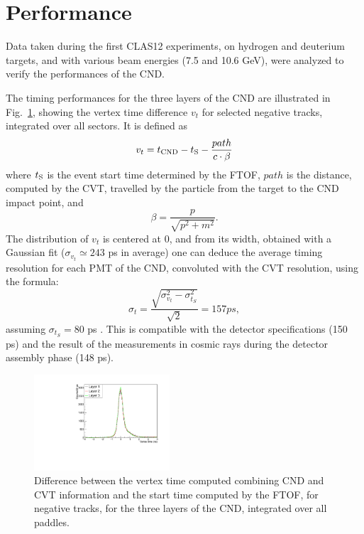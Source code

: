 \section{Performance}

Data taken during the first CLAS12 experiments, on hydrogen and deuterium targets, and with various beam energies (7.5 and 10.6 GeV), were analyzed to verify the performances of the CND. 

The timing performances for the three layers of the CND are illustrated in Fig.~\ref{fig_performance_deltat_layers}, showing the vertex time difference $v_t$ for selected negative tracks, integrated over all sectors. It is defined as
\begin{equation}\label{eq_vtp_definition}
v_t=t_{\rm{CND}}-t_{\rm{S}}-\frac{path}{c \cdot \beta}
\end{equation}
where $t_{\rm{S}}$ is the event start time determined by the FTOF, $path$ is the distance, computed by the CVT, travelled by the particle from the target to the CND impact point, and
\begin{equation}\label{eq_beta_definition}
\beta=\frac{p}{\sqrt{p^2+m^2}} .
\end{equation}
The distribution of $v_t$ is centered at 0, and from its width, obtained with a Gaussian fit ($\sigma_{v_t}\simeq 243$ ps in average) one can deduce the average timing resolution for each PMT of the CND, convoluted with the CVT resolution, using the formula:
\begin{equation}\label{eq_resolution}
\sigma_t=\frac{\sqrt{\sigma_{v_t}^2-\sigma_{t_{S}}^2}}{\sqrt{2}}=157 ps, 
\end{equation}
assuming $\sigma_{t_{S}}=80$ ps \cite{ftofref}. This is compatible with the detector specifications (150 ps) and the result of the measurements in cosmic rays during the detector assembly phase \cite{Niccolai:2018qzm} (148 ps).

\begin{figure}[htb]  
\begin{center}
\includegraphics[width=0.45\textwidth]{Figure/canVTPlot.pdf}
\caption {Difference between the vertex time computed combining CND and CVT information and the start time computed by the FTOF, for negative tracks, for the three layers of the CND, integrated over all paddles. }
\label{fig_performance_deltat_layers}
\end{center}
\end{figure}

